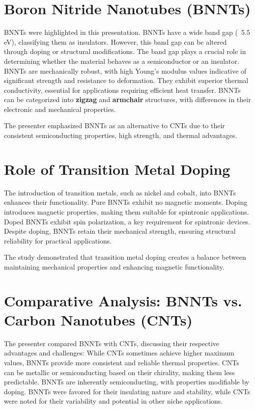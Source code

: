 \documentclass[12pt]{article}
\begin{document}
\section{Boron Nitride Nanotubes (BNNTs)}
    BNNTs were highlighted in this presentation. BNNTs have a wide band gap (~5.5 eV), classifying them as insulators. However, this band gap can be altered through doping or structural modifications. The band gap plays a crucial role in determining whether the material behaves as a semiconductor or an insulator. BNNTs are mechanically robust, with high Young’s modulus values indicative of significant strength and resistance to deformation. They exhibit superior thermal conductivity, essential for applications requiring efficient heat transfer. BNNTs can be categorized into \textbf{zigzag} and \textbf{armchair} structures, with differences in their electronic and mechanical properties.

    The presenter emphasized BNNTs as an alternative to CNTs due to their consistent semiconducting properties, high strength, and thermal advantages.

\section{Role of Transition Metal Doping}
    The introduction of transition metals, such as nickel and cobalt, into BNNTs enhances their functionality. Pure BNNTs exhibit no magnetic moments. Doping introduces magnetic properties, making them suitable for spintronic applications. Doped BNNTs exhibit spin polarization, a key requirement for spintronic devices. Despite doping, BNNTs retain their mechanical strength, ensuring structural reliability for practical applications.
    

    The study demonstrated that transition metal doping creates a balance between maintaining mechanical properties and enhancing magnetic functionality.

\section{Comparative Analysis: BNNTs vs. Carbon Nanotubes (CNTs)}
    The presenter compared BNNTs with CNTs, discussing their respective advantages and challenges:
    While CNTs sometimes achieve higher maximum values, BNNTs provide more consistent and reliable thermal properties. CNTs can be metallic or semiconducting based on their chirality, making them less predictable. BNNTs are inherently semiconducting, with properties modifiable by doping. BNNTs were favored for their insulating nature and stability, while CNTs were noted for their variability and potential in other niche applications.
\end{document}
